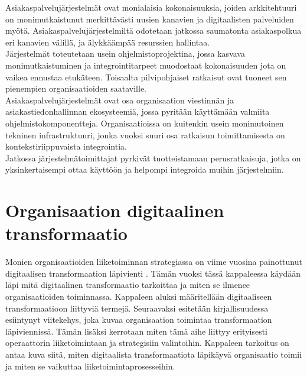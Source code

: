 \documentclass[finnish,12pt,a4paper,pdftex]{article}
\begin{document}
\noindent Asiakaspalvelujärjestelmät ovat monialaisia kokonaisuuksia, joiden arkkitehtuuri on monimutkaistunut merkittävästi uusien kanavien ja digitaalisten palveluiden myötä. Asiakaspalvelujärjestelmiltä odotetaan jatkossa saumatonta asiakaspolkua eri kanavien välillä, ja älykkäämpää resurssien hallintaa. \\

\noindent Järjestelmät toteutetaan usein ohjelmistoprojektina, jossa kasvava monimutkaistuminen ja integrointitarpeet muodostaat kokonaisuuden jota on vaikea ennustaa etukäteen. Toisaalta pilvipohjaiset ratkaisut ovat tuoneet sen pienempien organisaatioiden saataville.\\

\noindent Asiakaspalvelujärjestelmät ovat osa organisaation viestinnän ja asiakastiedonhallinnan ekosysteemiä, jossa pyritään käyttämään valmiita ohjelmistokomponentteja. Organisaatioissa on kuitenkin usein monimutoinen tekninen infrastruktuuri, jonka vuoksi suuri osa ratkaisun toimittamisesta on kontekstiriippuvaista integrointia.\\

\noindent Jatkossa järjestelmätoimittajat pyrkivät tuotteistamaan perusratkaisuja, jotka on yksinkertaisempi ottaa käyttöön ja helpompi integroida muihin järjestelmiin.


\clearpage

\section{Organisaation digitaalinen transformaatio}
Monien organisaatioiden liiketoiminnan strategiassa on viime vuosina painottunut digitaalisen transformaation läpivienti \citep{lamoureux}. Tämän vuoksi tässä kappaleessa käydään läpi mitä digitaalinen transformaatio tarkoittaa ja miten se ilmenee organisaatioiden toiminnassa. Kappaleen aluksi määritellään digitaaliseen transformaatioon liittyviä termejä. Seuraavaksi esitetään kirjallisuudessa esiintynyt viitekehys, joka kuvaa organisaation toimintaa transformaation läpiviennissä. Tämän lisäksi kerrotaan miten tämä aihe liittyy erityisesti operaattorin liiketoimintaan ja strategisiin valintoihin. Kappaleen tarkoitus on antaa kuva siitä, miten digitaalista transformaatiota läpikäyvä organisaatio toimii ja miten se vaikuttaa liiketoimintaprosesseihin.
\end{document}
